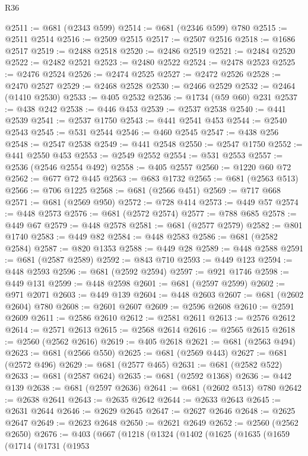 \begin{lexlean}{R36}
\begin{coremodule}
@2511 := @681 (@2343 @599)
@2514 := @681 (@2346 @599) @780
@2515 := @2511 @2514
@2516 := @2509 @2515
@2517 := @2507 @2516
@2518 := @1686 @2517
@2519 := @2488 @2518
@2520 := @2486 @2519
@2521 := @2484 @2520
@2522 := @2482 @2521
@2523 := @2480 @2522
@2524 := @2478 @2523
@2525 := @2476 @2524
@2526 := @2474 @2525
@2527 := @2472 @2526
@2528 := @2470 @2527
@2529 := @2468 @2528
@2530 := @2466 @2529
@2532 := @2464 (@1410 @2530)
@2533 := @405 @2532
@2536 := @1734 (@59 @60) @231
@2537 := @438 @242
@2538 := @446 @453
@2539 := @2537 @2538
@2540 := @441 @2539
@2541 := @2537 @1750
@2543 := @441 @2541 @453
@2544 := @2540 @2543
@2545 := @531 @2544
@2546 := @460 @2545
@2547 := @438 @256
@2548 := @2547 @2538
@2549 := @441 @2548
@2550 := @2547 @1750
@2552 := @441 @2550 @453
@2553 := @2549 @2552
@2554 := @531 @2553
@2557 := @2536 (@2546 @2554 @492)
@2558 := @405 @2557
@2560 := @1220 @60 @72
@2562 := @677 @72 @445
@2563 := @683 @1732
@2565 := @681 (@2563 @513)
@2566 := @706 @1225
@2568 := @681 (@2566 @451)
@2569 := @717 @668
@2571 := @681 (@2569 @950)
@2572 := @728 @414
@2573 := @449 @57
@2574 := @448 @2573
@2576 := @681 (@2572 @2574)
@2577 := @788 @685
@2578 := @449 @67
@2579 := @448 @2578
@2581 := @681 (@2577 @2579)
@2582 := @801 @1740
@2583 := @449 @82
@2584 := @448 @2583
@2586 := @681 (@2582 @2584)
@2587 := @820 @1353
@2588 := @449 @28
@2589 := @448 @2588
@2591 := @681 (@2587 @2589)
@2592 := @843 @710
@2593 := @449 @123
@2594 := @448 @2593
@2596 := @681 (@2592 @2594)
@2597 := @921 @1746
@2598 := @449 @131
@2599 := @448 @2598
@2601 := @681 (@2597 @2599)
@2602 := @971 @2071
@2603 := @449 @139
@2604 := @448 @2603
@2607 := @681 (@2602 @2604) @780
@2608 := @2601 @2607
@2609 := @2596 @2608
@2610 := @2591 @2609
@2611 := @2586 @2610
@2612 := @2581 @2611
@2613 := @2576 @2612
@2614 := @2571 @2613
@2615 := @2568 @2614
@2616 := @2565 @2615
@2618 := @2560 (@2562 @2616)
@2619 := @405 @2618
@2621 := @681 (@2563 @494)
@2623 := @681 (@2566 @550)
@2625 := @681 (@2569 @443)
@2627 := @681 (@2572 @496)
@2629 := @681 (@2577 @465)
@2631 := @681 (@2582 @522)
@2633 := @681 (@2587 @624)
@2635 := @681 (@2592 @1368)
@2636 := @442 @139
@2638 := @681 (@2597 @2636)
@2641 := @681 (@2602 @513) @780
@2642 := @2638 @2641
@2643 := @2635 @2642
@2644 := @2633 @2643
@2645 := @2631 @2644
@2646 := @2629 @2645
@2647 := @2627 @2646
@2648 := @2625 @2647
@2649 := @2623 @2648
@2650 := @2621 @2649
@2652 := @2560 (@2562 @2650)
@2676 := @403
    (@667
      (@1218
        (@1324
          (@1402
            (@1625
              (@1635
                (@1659
                  (@1714
                    (@1731
                      (@1953

\end{coremodule}
\end{lexlean}
